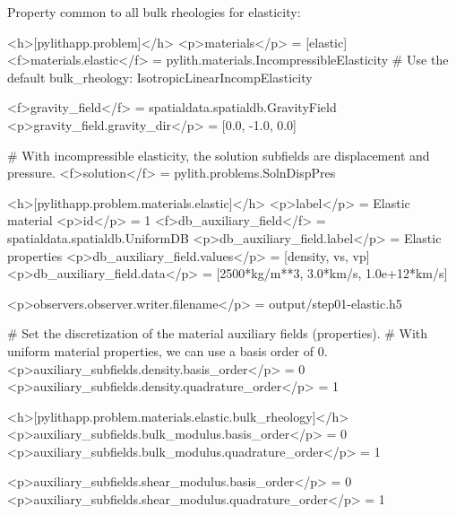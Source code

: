 Property common to all bulk rheologies for elasticity:
\begin{inventory}
\end{inventory}

\begin{cfg}
<h>[pylithapp.problem]</h>
<p>materials</p> = [elastic]
<f>materials.elastic</f> = pylith.materials.IncompressibleElasticity
# Use the default bulk_rheology: IsotropicLinearIncompElasticity

<f>gravity_field</f> = spatialdata.spatialdb.GravityField
<p>gravity_field.gravity_dir</p> = [0.0, -1.0, 0.0]

# With incompressible elasticity, the solution subfields are displacement and pressure.
<f>solution</f> = pylith.problems.SolnDispPres

<h>[pylithapp.problem.materials.elastic]</h>
<p>label</p> = Elastic material
<p>id</p> = 1
<f>db_auxiliary_field</f> = spatialdata.spatialdb.UniformDB
<p>db_auxiliary_field.label</p> = Elastic properties
<p>db_auxiliary_field.values</p> = [density, vs, vp]
<p>db_auxiliary_field.data</p> = [2500*kg/m**3, 3.0*km/s, 1.0e+12*km/s]

<p>observers.observer.writer.filename</p> = output/step01-elastic.h5

# Set the discretization of the material auxiliary fields (properties).
# With uniform material properties, we can use a basis order of 0.
<p>auxiliary_subfields.density.basis_order</p> = 0
<p>auxiliary_subfields.density.quadrature_order</p> = 1

<h>[pylithapp.problem.materials.elastic.bulk_rheology]</h>
<p>auxiliary_subfields.bulk_modulus.basis_order</p> = 0
<p>auxiliary_subfields.bulk_modulus.quadrature_order</p> = 1

<p>auxiliary_subfields.shear_modulus.basis_order</p> = 0
<p>auxiliary_subfields.shear_modulus.quadrature_order</p> = 1
\end{cfg}




